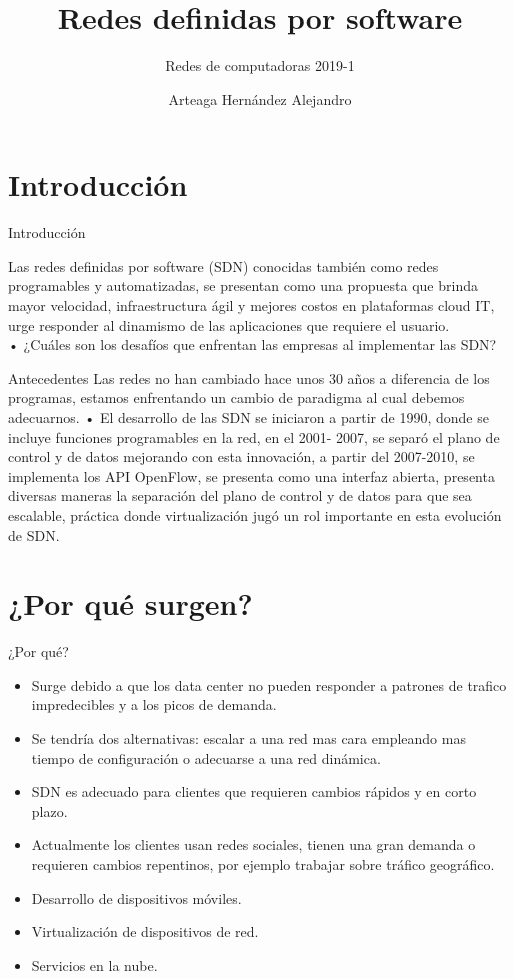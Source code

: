 \documentclass[10pt]{beamer}
\title{Redes definidas por software}
\subtitle{Redes de computadoras 2019-1}
\date{}
\author{Arteaga Hernández Alejandro}
\institute{Universidad Autónoma de México}
\begin{document}
\maketitle



\section{Introducción}

\begin{frame}[fragile]{Introducción}

Las redes definidas por software (SDN) conocidas también como
redes programables y automatizadas, se presentan como una
propuesta que brinda mayor velocidad, infraestructura ágil y
mejores costos en plataformas cloud IT, urge responder al
dinamismo de las aplicaciones que requiere el usuario.\\
• ¿Cuáles son los desafíos que enfrentan las empresas al
implementar las SDN? 
\end{frame}


\begin{frame}[fragile]{Antecedentes}
Las redes no han cambiado hace unos 30 años a diferencia
de los programas, estamos enfrentando un cambio de
paradigma al cual debemos adecuarnos.
• El desarrollo de las SDN se iniciaron a partir de 1990, donde
se incluye funciones programables en la red, en el 2001-
2007, se separó el plano de control y de datos mejorando
con esta innovación, a partir del 2007-2010, se implementa
los API OpenFlow, se presenta como una interfaz abierta,
presenta diversas maneras la separación del plano de control
y de datos para que sea escalable, práctica donde
virtualización jugó un rol importante en esta evolución de
SDN.
\end{frame}

\section{¿Por qué surgen?}

\begin{frame}{¿Por qué?}
\begin{itemize}
\item Surge debido a que los data center no pueden responder a patrones de trafico impredecibles y a los picos de demanda.
\item Se tendría dos alternativas: escalar a una red mas cara empleando mas tiempo de configuración o adecuarse a una red dinámica.
\item SDN es adecuado para clientes que requieren cambios rápidos y en corto plazo.
\item Actualmente los clientes usan redes sociales, tienen una gran demanda o requieren cambios repentinos, por ejemplo trabajar sobre tráfico geográfico.
\item Desarrollo de dispositivos móviles.
\item Virtualización de dispositivos de red.
\item Servicios en la nube.
\end{itemize}
\end{frame}
\end{document}
